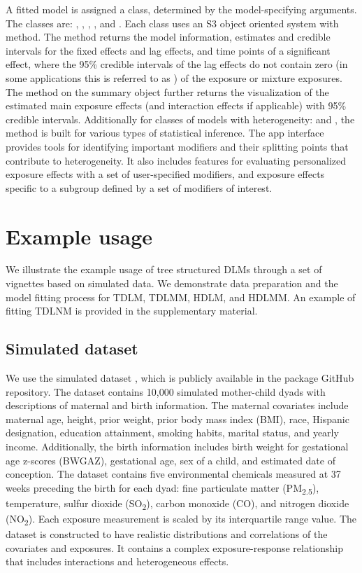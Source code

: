 A fitted model is assigned a class, determined by the model-specifying arguments. The classes are: , , , , and . Each class uses an S3 object oriented system with  method. The  method returns the model information, estimates and credible intervals for the fixed effects and lag effects, and time points of a significant effect, where the 95\% credible intervals of the lag effects do not contain zero (in some applications this is referred to as ) of the exposure or mixture exposures. The  method on the summary object further returns the visualization of the estimated main exposure effects (and interaction effects if applicable) with 95\% credible intervals. Additionally for classes of models with heterogeneity:  and , the  method is built for various types of statistical inference. The  app interface provides tools for identifying important modifiers and their splitting points that contribute to heterogeneity. It also includes features for evaluating personalized exposure effects with a set of user-specified modifiers, and exposure effects specific to a subgroup defined by a set of modifiers of interest.

\section{Example usage}
We illustrate the example usage of tree structured DLMs through a set of vignettes based on simulated data. We demonstrate data preparation and the model fitting process for TDLM, TDLMM, HDLM, and HDLMM. An example of fitting TDLNM is provided in the supplementary material.

\subsection{Simulated dataset}
We use the simulated dataset , which is publicly available in the  package GitHub repository. The dataset contains 10,000 simulated mother-child dyads with descriptions of maternal and birth information. The maternal covariates include maternal age, height, prior weight, prior body mass index (BMI), race, Hispanic designation, education attainment, smoking habits, marital status, and yearly income. Additionally, the birth information includes birth weight for gestational age z-scores (BWGAZ), gestational age, sex of a child, and estimated date of conception. The dataset contains five environmental chemicals measured at 37 weeks preceding the birth for each dyad: fine particulate matter (PM\textsubscript{2.5}), temperature, sulfur dioxide (SO\textsubscript{2}), carbon monoxide (CO), and nitrogen dioxide (NO\textsubscript{2}). Each exposure measurement is scaled by its interquartile range value. The dataset is constructed to have realistic distributions and correlations of the covariates and exposures. It contains a complex exposure-response relationship that includes interactions and heterogeneous effects.

